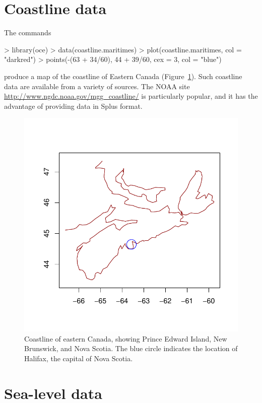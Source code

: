\documentclass{article}
\begin{document}
\section{Coastline data}
The commands
\begin{Schunk}
\begin{Sinput}
> library(oce)
> data(coastline.maritimes)
> plot(coastline.maritimes, col = "darkred")
> points(-(63 + 34/60), 44 + 39/60, cex = 3, col = "blue")
\end{Sinput}
\end{Schunk}
produce a map of the coastline of Eastern Canada (Figure~\ref{fig:coastline}). Such coastline
data are available from a variety of sources. The NOAA site
\url{http://www.ngdc.noaa.gov/mgg_coastline/}
is particularly popular, and it has the advantage
of providing data in Splus format.
\begin{figure}
\begin{center}
\includegraphics{oce-coastlinefig}
\end{center}
\caption{Coastline of eastern Canada, showing Prince Edward Island, New Brunswick, and Nova Scotia.  The blue circle indicates the location of 
Halifax, the capital of Nova Scotia.}
\label{fig:coastline}
\end{figure}

\section{Sea-level data}
\end{document}
